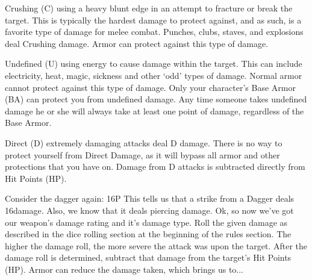 \documentclass[twoside]{book}
\begin{document}
                
                 Crushing (C)   
                    using a heavy blunt edge in an attempt to
                   fracture or break the target. This is typically the
                   hardest damage to protect against, and as such, is a
                   favorite type of damage for melee combat. Punches,
                   clubs, staves, and explosions deal Crushing damage.
                   Armor can protect against this type of damage. 
                
                
                 Undefined (U)   
                    using energy to cause damage within the target.
                   This can include electricity, heat, magic, sickness
                   and other `odd' types of damage. Normal
                   armor cannot protect against this type of damage. Only
                   your character's Base Armor (BA) can protect you
                   from undefined damage. Any time someone takes
                   undefined damage he or she will always take at least
                   one point of damage, regardless of the Base Armor.
                   
                
                
                 Direct (D)   
                    extremely damaging attacks deal D damage. There
                   is no way to protect yourself from Direct Damage, as
                   it will bypass all armor and other protections that
                   you have on. Damage from D attacks is subtracted
                   directly from Hit Points (HP). 
                
             Consider the dagger again: 16P  This tells us that a strike from a Dagger deals 16damage. Also, we know that it deals piercing damage.
                Ok, so now we've got our weapon's damage
               rating and it's damage type. Roll the given damage
               as described in the dice rolling section at the beginning
               of the rules section. The higher the damage roll, the more
               severe the attack was upon the target.  After the damage roll is determined, subtract that
               damage from the target's Hit Points (HP). Armor can
               reduce the damage taken, which brings us to...
               
\end{document}
